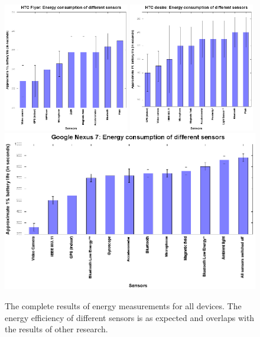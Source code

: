 \begin{figure}[H]
\centering
\includegraphics[width=0.49\textwidth, scale=0.6]{plots/htc_flyer}
\includegraphics[width=0.49\textwidth, scale=0.6]{plots/htc_desire}
\includegraphics[width=\textwidth, scale=0.9]{plots/google_nexus_7}
\caption{\label{p:all_results} The complete results of energy measurements for all devices. The energy efficiency of different sensors is as expected and overlaps with the results of other research. }
\end{figure}

